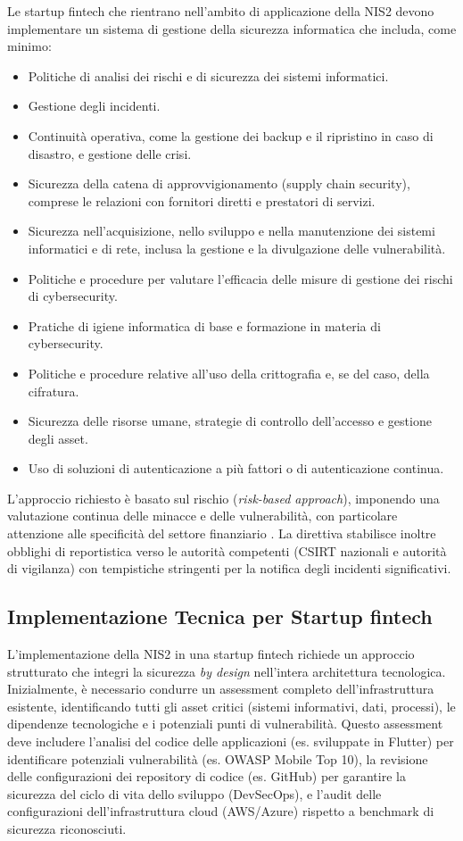 Le startup fintech che rientrano nell'ambito di applicazione della NIS2 devono implementare un sistema di gestione della sicurezza informatica che includa, come minimo:
\begin{itemize}
    \item Politiche di analisi dei rischi e di sicurezza dei sistemi informatici.
    \item Gestione degli incidenti.
    \item Continuità operativa, come la gestione dei backup e il ripristino in caso di disastro, e gestione delle crisi.
    \item Sicurezza della catena di approvvigionamento (supply chain security), comprese le relazioni con fornitori diretti e prestatori di servizi.
    \item Sicurezza nell'acquisizione, nello sviluppo e nella manutenzione dei sistemi informatici e di rete, inclusa la gestione e la divulgazione delle vulnerabilità.
    \item Politiche e procedure per valutare l'efficacia delle misure di gestione dei rischi di cybersecurity.
    \item Pratiche di igiene informatica di base e formazione in materia di cybersecurity.
    \item Politiche e procedure relative all'uso della crittografia e, se del caso, della cifratura.
    \item Sicurezza delle risorse umane, strategie di controllo dell'accesso e gestione degli asset.
    \item Uso di soluzioni di autenticazione a più fattori o di autenticazione continua.
\end{itemize}
L'approccio richiesto è basato sul rischio (\textit{risk-based approach}), imponendo una valutazione continua delle minacce e delle vulnerabilità, con particolare attenzione alle specificità del settore finanziario \cite{cybersecurity360NIS2}. La direttiva stabilisce inoltre obblighi di reportistica verso le autorità competenti (CSIRT nazionali e autorità di vigilanza) con tempistiche stringenti per la notifica degli incidenti significativi.

\subsection{Implementazione Tecnica per Startup fintech}
L'implementazione della NIS2 in una startup fintech richiede un approccio strutturato che integri la sicurezza \textit{by design} nell'intera architettura tecnologica. Inizialmente, è necessario condurre un assessment completo dell'infrastruttura esistente, identificando tutti gli asset critici (sistemi informativi, dati, processi), le dipendenze tecnologiche e i potenziali punti di vulnerabilità. Questo assessment deve includere l'analisi del codice delle applicazioni (es. sviluppate in Flutter) per identificare potenziali vulnerabilità (es. OWASP Mobile Top 10), la revisione delle configurazioni dei repository di codice (es. GitHub) per garantire la sicurezza del ciclo di vita dello sviluppo (DevSecOps), e l'audit delle configurazioni dell'infrastruttura cloud (AWS/Azure) rispetto a benchmark di sicurezza riconosciuti.

